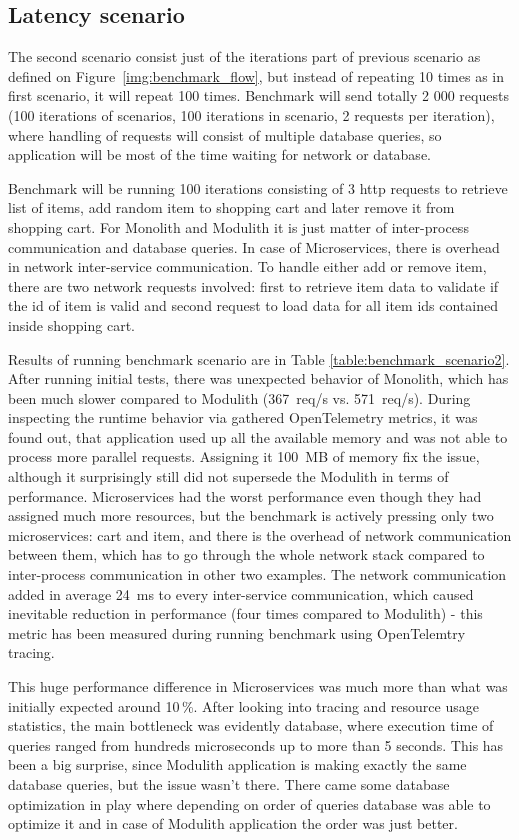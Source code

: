 \subsection{Latency scenario}
The second scenario consist just of the iterations part of previous scenario as defined on Figure~\ref{img:benchmark_flow}, but instead of repeating 10 times as in first scenario, it will repeat 100 times. Benchmark will send totally 2 000 requests (100 iterations of scenarios, 100 iterations in scenario, 2 requests per iteration), where handling of requests will consist of multiple database queries, so application will be most of the time waiting for network or database.

Benchmark will be running 100 iterations consisting of 3 http requests to retrieve list of items, add random item to shopping cart and later remove it from shopping cart. For Monolith and Modulith it is just matter of inter-process communication and database queries. In case of Microservices, there is overhead in network inter-service communication. To handle either add or remove item, there are two network requests involved: first to retrieve item data to validate if the id of item is valid and second request to load data for all item ids contained inside shopping cart.

Results of running benchmark scenario are in Table \ref{table:benchmark_scenario2}. After running initial tests, there was unexpected behavior of Monolith, which has been much slower compared to Modulith (367~req/s vs. 571~req/s). During inspecting the runtime behavior via gathered OpenTelemetry metrics, it was found out, that application used up all the available memory and was not able to process more parallel requests. Assigning it 100~MB of memory fix the issue, although it surprisingly still did not supersede the Modulith in terms of performance. Microservices had the worst performance even though they had assigned much more resources, but the benchmark is actively pressing only two microservices: cart and item, and there is the overhead of network communication between them, which has to go through the whole network stack compared to inter-process communication in other two examples. The network communication added in average 24~ms to every inter-service communication, which caused inevitable reduction in performance (four times compared to Modulith) - this metric has been measured during running benchmark using OpenTelemtry tracing.

This huge performance difference in Microservices was much more than what was initially expected around 10\,\%. After looking into tracing and resource usage statistics, the main bottleneck was evidently database, where execution time of queries ranged from hundreds microseconds up to more than 5 seconds. This has been a big surprise, since Modulith application is making exactly the same database queries, but the issue wasn't there. There came some database optimization in play where depending on order of queries database was able to optimize it and in case of Modulith application the order was just better.

